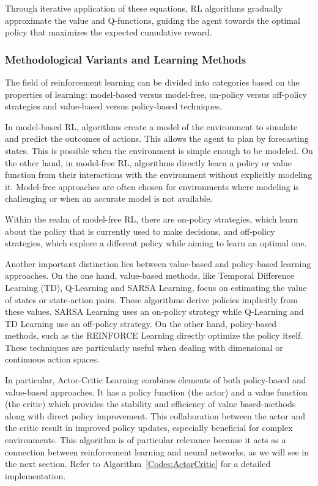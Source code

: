 Through iterative application of these equations, RL algorithms gradually approximate the value and Q-functions, guiding the agent towards the optimal policy that maximizes the expected cumulative reward.

\subsubsection{Methodological Variants and Learning Methods}
The field of reinforcement learning can be divided into categories based on the properties of learning: model-based versus model-free, on-policy versus off-policy strategies and value-based versus policy-based techniques.

In model-based RL, algorithms create a model of the environment to simulate and predict the outcomes of actions. This allows the agent to plan by forecasting states. This is possible when the environment is simple enough to be modeled. On the other hand, in model-free RL, algorithms directly learn a policy or value function from their interactions with the environment without explicitly modeling it. Model-free approaches are often chosen for environments where modeling is challenging or when an accurate model is not available.

Within the realm of model-free RL, there are on-policy strategies, which learn about the policy that is currently used to make decisions, and off-policy strategies, which explore a different policy while aiming to learn an optimal one.

Another important distinction lies between value-based and policy-based learning approaches. On the one hand, value-based methods, like Temporal Difference Learning (TD), Q-Learning and SARSA Learning, focus on estimating the value of states or state-action pairs. These algorithms derive policies implicitly from these values. SARSA Learning uses an on-policy strategy while Q-Learning and TD Learning use an off-policy strategy. On the other hand, policy-based methods, such as the REINFORCE Learning directly optimize the policy itself. These techniques are particularly useful when dealing with dimensional or continuous action spaces. 

In particular, Actor-Critic Learning combines elements of both policy-based and value-based approaches. It has a policy function (the actor) and a value function (the critic) which provides the stability and efficiency of value based-methods along with direct policy improvement. This collaboration between the actor and the critic result in improved policy updates, especially beneficial for complex environments. This algorithm is of particular relevance because it acts as a connection between reinforcement learning and neural networks, as we will see in the next section. Refer to Algorithm~\ref{Codes:ActorCritic} for a detailed implementation.

